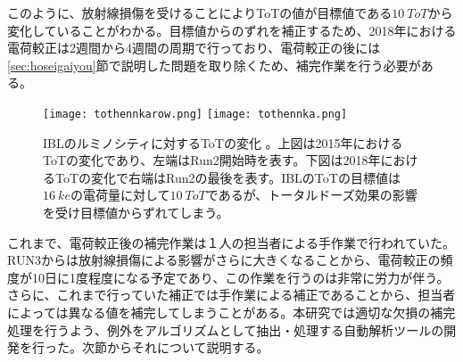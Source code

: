 
このように、放射線損傷を受けることによりToTの値が目標値である$10\ \si{ToT}$から変化していることがわかる。目標値からのずれを補正するため、2018年における電荷較正は2週間から4週間の周期で行っており、電荷較正の後には\ref{sec:hoseigaiyou}節で説明した問題を取り除くため、補完作業を行う必要がある。

\begin{figure}[tbp]
  \centering
  \texttt{[image: tothennkarow.png]}
  \texttt{[image: tothennka.png]}
  \caption[ルミノシティに対するToTの変化]{IBLのルミノシティに対するToTの変化 。上図は2015年におけるToTの変化\cite{tothenkarow}であり、左端はRun2開始時を表す。下図は2018年におけるToTの変化\cite{tothennka}で右端はRun2の最後を表す。IBLのToTの目標値は$16\ \si{ke}$の電荷量に対して$10\ \si{ToT}$であるが、トータルドーズ効果の影響を受け目標値からずれてしまう。}
  \label{fig:thresholdhennka}
\end{figure}





これまで、電荷較正後の補完作業は１人の担当者による手作業で行われていた。RUN3からは放射線損傷による影響がさらに大きくなることから、電荷較正の頻度が10日に1度程度になる予定であり、この作業を行うのは非常に労力が伴う。さらに、これまで行っていた補正では手作業による補正であることから、担当者によっては異なる値を補完してしまうことがある。本研究では適切な欠損の補完処理を行うよう、例外をアルゴリズムとして抽出・処理する自動解析ツールの開発を行った。次節からそれについて説明する。


